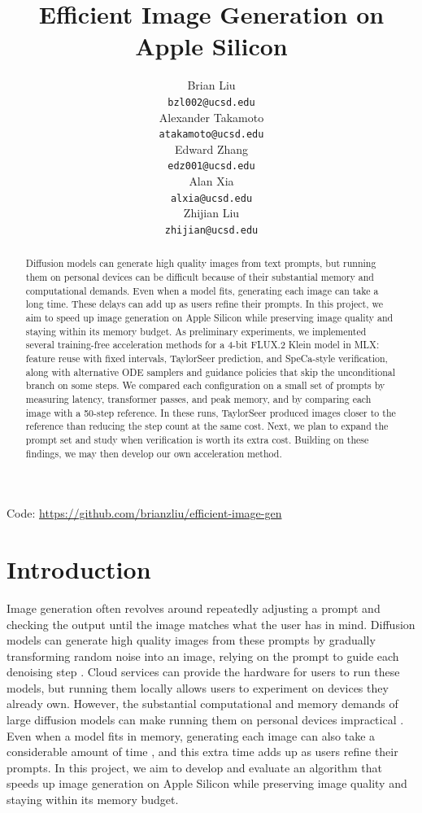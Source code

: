 \documentclass[12pt,letterpaper]{article}
\title{Efficient Image Generation on Apple Silicon}
\author{Brian Liu \\
  {\tt bzl002@ucsd.edu} \\\And
  Alexander Takamoto \\
  {\tt atakamoto@ucsd.edu} \\\And
  Edward Zhang \\
  {\tt edz001@ucsd.edu} \\\And
  Alan Xia\\
  {\tt alxia@ucsd.edu} \\\And
  Zhijian Liu \\
  {\tt zhijian@ucsd.edu} \\}
\begin{document}
\maketitle


\begin{abstract}
    Diffusion models can generate high quality images from text prompts, but running them on personal devices can be difficult because of their substantial memory and computational demands. Even when a model fits, generating each image can take a long time. These delays can add up as users refine their prompts. In this project, we aim to speed up image generation on Apple Silicon while preserving image quality and staying within its memory budget. As preliminary experiments, we implemented several training-free acceleration methods for a 4-bit FLUX.2 Klein model in MLX: feature reuse with fixed intervals, TaylorSeer prediction, and SpeCa-style verification, along with alternative ODE samplers and guidance policies that skip the unconditional branch on some steps. We compared each configuration on a small set of prompts by measuring latency, transformer passes, and peak memory, and by comparing each image with a 50-step reference. In these runs, TaylorSeer produced images closer to the reference than reducing the step count at the same cost. Next, we plan to expand the prompt set and study when verification is worth its extra cost. Building on these findings, we may then develop our own acceleration method.
\end{abstract}

\begin{center}
Code: \url{https://github.com/brianzliu/efficient-image-gen}
\end{center}

\maketoc
\clearpage


\section{Introduction}
\label{sec:intro}

Image generation often revolves around repeatedly adjusting a prompt and checking the output until the image matches what the user has in mind. Diffusion models can generate high quality images from these prompts by gradually transforming random noise into an image, relying on the prompt to guide each denoising step \citep{rombach2021highresolution}. Cloud services can provide the hardware for users to run these models, but running them locally allows users to experiment on devices they already own. However, the substantial computational and memory demands of large diffusion models can make running them on personal devices impractical \citep{zhao2024mobilediffusioninstanttexttoimagegeneration}.
Even when a model fits in memory, generating each image can also take a considerable amount of time \citep{li2025svdquantabsorbingoutlierslowrank}, and this extra time adds up as users refine their prompts. In this project, we aim to develop and evaluate an algorithm that speeds up image generation on Apple Silicon while preserving image quality and staying within its memory budget.
\end{document}
